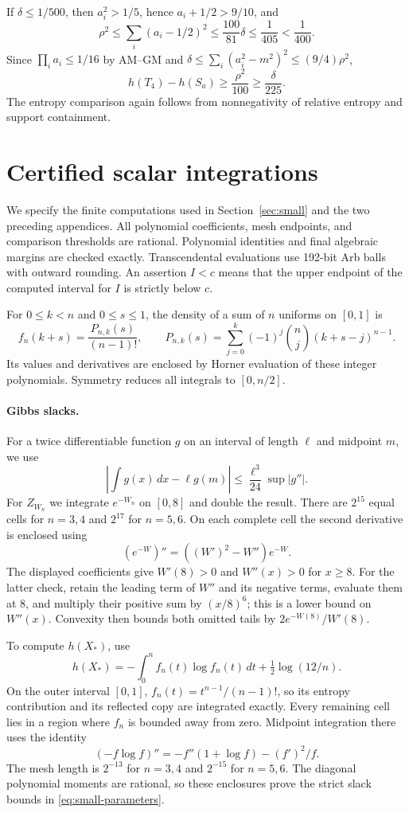 \documentclass[11pt,a4paper]{article}
\theoremstyle{remark}\newtheorem{remark}[theorem]{Remark}
\begin{document}
If $\delta\le1/500$, then $a_i^2>1/5$, hence $a_i+1/2>9/10$, and
\[
\rho^2\le\sum_i(a_i-1/2)^2\le\frac{100}{81}\delta
\le\frac1{405}<\frac1{400}.
\]
Since $\prod_i a_i\le1/16$ by AM--GM and
$\delta\le\sum_i(a_i^2-m^2)^2\le(9/4)\rho^2$,
\[
h(T_4)-h(S_a)\ge\frac{\rho^2}{100}\ge\frac{\delta}{225}.
\]
The entropy comparison again follows from nonnegativity of relative
entropy and support containment.

\section{Certified scalar integrations}\label{app:small-integrals}
We specify the finite computations used in Section~\ref{sec:small} and
the two preceding appendices. All polynomial coefficients, mesh endpoints,
and comparison thresholds are rational. Polynomial identities and final
algebraic margins are checked exactly. Transcendental evaluations use
192-bit Arb balls with outward rounding. An assertion $I<c$ means that
the upper endpoint of the computed interval for $I$ is strictly below $c$.

For $0\le k<n$ and $0\le s\le1$, the density of a sum of $n$ uniforms
on $[0,1]$ is
\[
 f_n(k+s)=\frac{P_{n,k}(s)}{(n-1)!},\qquad
 P_{n,k}(s)=\sum_{j=0}^k(-1)^j\binom nj(k+s-j)^{n-1}.
\]
Its values and derivatives are enclosed by Horner evaluation of these
integer polynomials. Symmetry reduces all integrals to $[0,n/2]$.

\paragraph{Gibbs slacks.}
For a twice differentiable function $g$ on an interval of length $\ell$
and midpoint $m$, we use
\[
 \left|\int g(x)\,dx-\ell g(m)\right|
 \le\frac{\ell^3}{24}\sup|g''|.
\]
For $Z_{W_n}$ we integrate $e^{-W_n}$ on $[0,8]$ and double the result.
There are $2^{15}$ equal cells for $n=3,4$ and $2^{17}$ for $n=5,6$.
On each complete cell the second derivative is enclosed using
\[
 (e^{-W})''=((W')^2-W'')e^{-W}.
\]
The displayed coefficients give $W'(8)>0$ and $W''(x)>0$ for $x\ge8$.
For the latter check, retain the leading term of $W''$ and its negative
terms, evaluate them at $8$, and multiply their positive sum by
$(x/8)^6$; this is a lower bound on $W''(x)$. Convexity then bounds both
omitted tails by $2e^{-W(8)}/W'(8)$.

To compute $h(X_*)$, use
\[
 h(X_*)=-\int_0^n f_n(t)\log f_n(t)\,dt+\tfrac12\log(12/n).
\]
On the outer interval $[0,1]$, $f_n(t)=t^{n-1}/(n-1)!$, so its entropy
contribution and its reflected copy are integrated exactly. Every
remaining cell lies in a region where $f_n$ is bounded away from zero.
Midpoint integration there uses the identity
\[
 (-f\log f)''=-f''(1+\log f)-(f')^2/f.
\]
The mesh length is $2^{-13}$ for $n=3,4$ and $2^{-15}$ for $n=5,6$.
The diagonal polynomial moments are rational, so these enclosures prove
the strict slack bounds in \eqref{eq:small-parameters}.
\end{document}
